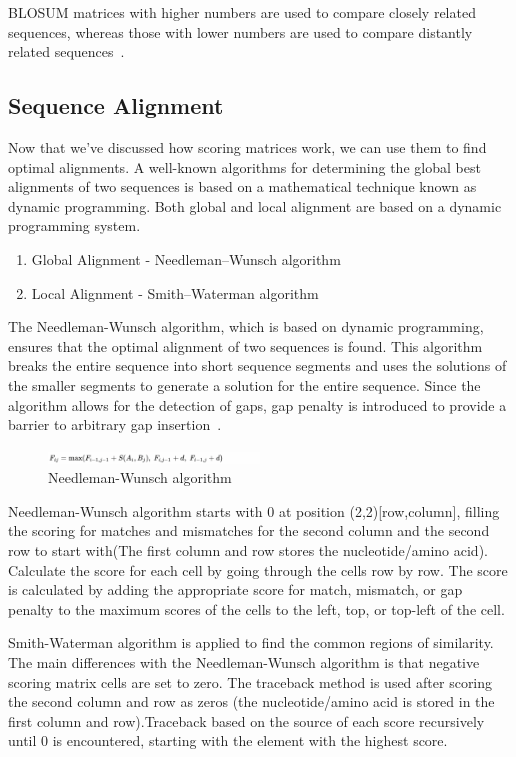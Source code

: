 \documentclass[]{final_report}
\begin{document}
BLOSUM matrices with higher numbers are used to compare closely related sequences, whereas those with lower numbers are used to compare distantly related sequences~\cite{attwood2003introduction}.

\subsection{Sequence Alignment}
Now that we've discussed how scoring matrices work, we can use them to find optimal alignments.
A well-known algorithms for determining the global best alignments of two sequences is based on a mathematical technique known as dynamic programming.
Both global and local alignment are based on a dynamic programming system.

\begin{enumerate}
    \item Global Alignment - Needleman–Wunsch algorithm
    \item Local Alignment - Smith–Waterman algorithm
\end{enumerate} 

The Needleman-Wunsch algorithm, which is based on dynamic programming, ensures that the optimal alignment of two sequences is found. This algorithm breaks the entire sequence into short sequence segments and uses the solutions of the smaller segments to generate a solution for the entire sequence.
Since the algorithm allows for the detection of gaps, gap penalty is introduced to provide a barrier to arbitrary gap insertion~\cite{lesk_2013_bioinformatics}.

\begin{figure}[H]
    \centering
    \includegraphics[width=0.5\textwidth]{NW algo.png}
    \caption{Needleman-Wunsch algorithm}
    \label{fig:NW_algo}
\end{figure}

Needleman-Wunsch algorithm starts with 0 at position (2,2)[row,column], filling the scoring for matches and mismatches for the second column and the second row to start with(The first column and row stores the nucleotide/amino acid).
Calculate the score for each cell by going through the cells row by row. The score is calculated by adding the appropriate score for match, mismatch, or gap penalty to the maximum scores of the cells to the left, top, or top-left of the cell.

Smith-Waterman algorithm is applied to find the common regions of similarity. The main differences with the Needleman-Wunsch algorithm is that negative scoring matrix cells are set to zero. 
The traceback method is used after scoring the second column and row as zeros (the nucleotide/amino acid is stored in the first column and row).Traceback based on the source of each score recursively until 0 is encountered, starting with the element with the highest score.
\end{document}
